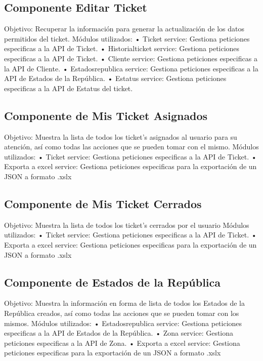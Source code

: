 \subsection{Componente Editar Ticket}
Objetivo: Recuperar la información para generar la actualización de los datos permitidos del ticket. 
\newline
Módulos utilizados: 
\newline
• Ticket service: Gestiona peticiones especificas a la API de Ticket.
\newline
• Historialticket  service: Gestiona peticiones especificas a la API de Ticket.
\newline
• Cliente  service: Gestiona peticiones especificas a la API de Cliente.
\newline
• Estadosrepublica  service: Gestiona peticiones especificas a la API de Estados de la República.
\newline
• Estatus  service: Gestiona peticiones especificas a la API de Estatus del ticket.

\subsection{Componente de Mis Ticket Asignados}
Objetivo: Muestra la lista de todos los ticket's asignados al usuario para su atención,  así como todas las acciones que se pueden tomar con el mismo.
\newline
Módulos utilizados: 
\newline
• Ticket service: Gestiona peticiones especificas a la API de Ticket.
\newline
• Exporta a excel service: Gestiona peticiones especificas para la exportación de un JSON a formato .xslx
\subsection{Componente de Mis Ticket Cerrados}
Objetivo: Muestra la lista de todos los ticket's cerrados por el usuario
\newline
Módulos utilizados: 
\newline
• Ticket service: Gestiona peticiones especificas a la API de Ticket.
\newline
• Exporta a excel service: Gestiona peticiones especificas para la exportación de un JSON a formato .xslx

\subsection{Componente de Estados de la República}
Objetivo: Muestra la información en forma de lista de todos los Estados de la República creados, así como todas las acciones que se pueden tomar con los mismos.
\newline
Módulos utilizados: 
\newline
• Estadosrepublica service: Gestiona peticiones especificas a la API de Estados de la República.
\newline
• Zona service: Gestiona peticiones especificas a la API de Zona.
\newline
• Exporta a excel service: Gestiona peticiones especificas para la exportación de un JSON a formato .xslx

